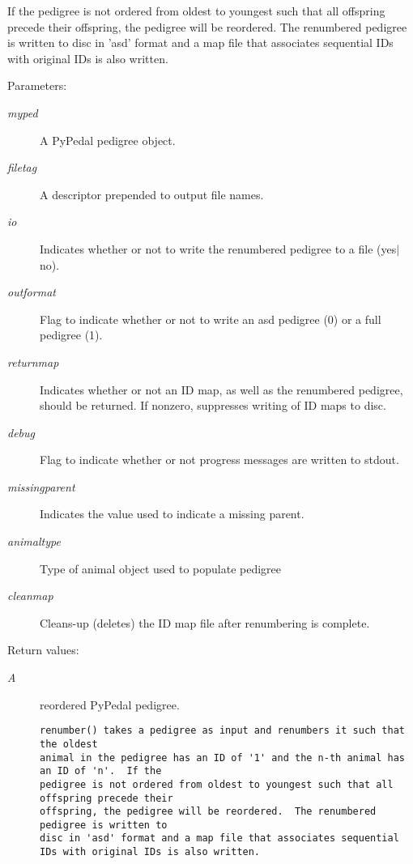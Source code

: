 If the pedigree is not ordered from oldest to youngest such that all offspring precede their offspring, the pedigree will be reordered. The renumbered pedigree is written to disc in 'asd' format and a map file that associates sequential IDs with original IDs is also written. \begin{Desc}
\item[Parameters:]
\begin{description}
\item[{\em myped}]A Py\-Pedal pedigree object. \item[{\em filetag}]A descriptor prepended to output file names. \item[{\em io}]Indicates whether or not to write the renumbered pedigree to a file (yes$|$no). \item[{\em outformat}]Flag to indicate whether or not to write an asd pedigree (0) or a full pedigree (1). \item[{\em returnmap}]Indicates whether or not an ID map, as well as the renumbered pedigree, should be returned. If nonzero, suppresses writing of ID maps to disc. \item[{\em debug}]Flag to indicate whether or not progress messages are written to stdout. \item[{\em missingparent}]Indicates the value used to indicate a missing parent. \item[{\em animaltype}]Type of animal object used to populate pedigree \item[{\em cleanmap}]Cleans-up (deletes) the ID map file after renumbering is complete. \end{description}
\end{Desc}
\begin{Desc}
\item[Return values:]
\begin{description}
\item[{\em A}]reordered Py\-Pedal pedigree.

\footnotesize\begin{verbatim}renumber() takes a pedigree as input and renumbers it such that the oldest
animal in the pedigree has an ID of '1' and the n-th animal has an ID of 'n'.  If the
pedigree is not ordered from oldest to youngest such that all offspring precede their
offspring, the pedigree will be reordered.  The renumbered pedigree is written to
disc in 'asd' format and a map file that associates sequential IDs with original IDs is also written.
\end{verbatim}
\normalsize
 \end{description}
\end{Desc}


